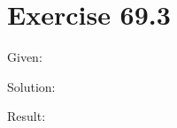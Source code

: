 \documentclass[a4paper, 10pt]{scrartcl}
\begin{document}
\section{Exercise 69.3}

Given:

Solution:

Result:
\end{document}

